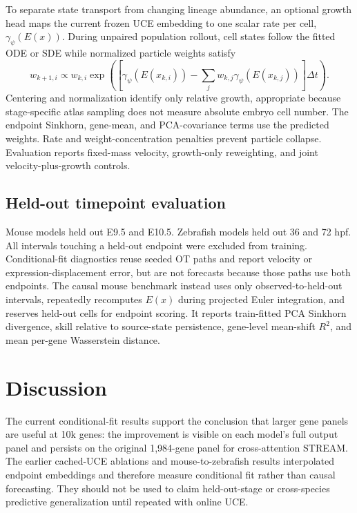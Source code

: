 \documentclass[11pt]{article}
\newcommand{\stream}{STREAM}
\newcommand{\uce}{UCE}
\begin{document}
To separate state transport from changing lineage abundance, an optional
growth head maps the current frozen \uce{} embedding to one scalar rate per
cell, $\gamma_\psi(E(x))$. During unpaired population rollout, cell states
follow the fitted ODE or SDE while normalized particle weights satisfy
\begin{equation}
  w_{k+1,i}\propto w_{k,i}\exp\!\left(
  [\gamma_\psi(E(x_{k,i}))-\sum_jw_{k,j}\gamma_\psi(E(x_{k,j}))]\Delta t
  \right).
\end{equation}
Centering and normalization identify only relative growth, appropriate because
stage-specific atlas sampling does not measure absolute embryo cell number.
The endpoint Sinkhorn, gene-mean, and PCA-covariance terms use the predicted
weights. Rate and weight-concentration penalties prevent particle collapse.
Evaluation reports fixed-mass velocity, growth-only reweighting, and joint
velocity-plus-growth controls.

\subsection{Held-out timepoint evaluation}

Mouse models held out E9.5 and E10.5. Zebrafish models held out 36 and 72 hpf.
All intervals touching a held-out endpoint were excluded from training.
Conditional-fit diagnostics reuse seeded OT paths and report velocity or
expression-displacement error, but are not forecasts because those paths use
both endpoints. The causal mouse benchmark instead uses only
observed-to-held-out intervals, repeatedly recomputes $E(x)$ during projected
Euler integration, and reserves held-out cells for endpoint scoring. It reports
train-fitted PCA Sinkhorn divergence, skill relative to source-state
persistence, gene-level mean-shift $R^2$, and mean per-gene Wasserstein distance.

\section{Discussion}

The current conditional-fit results support the conclusion that larger gene
panels are useful at 10k genes: the improvement is visible on each model's full
output panel and persists on the original 1,984-gene panel for cross-attention
\stream{}. The earlier cached-\uce{} ablations and mouse-to-zebrafish results
interpolated endpoint embeddings and therefore measure conditional fit rather
than causal forecasting. They should not be used to claim held-out-stage or
cross-species predictive generalization until repeated with online \uce{}.
\end{document}
